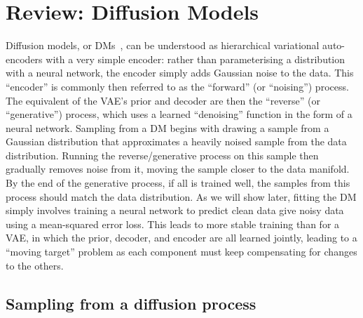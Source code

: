 \chapter{Review: Diffusion Models}
\label{sec:diffusion}

Diffusion models, or DMs~\citep{sohl2015deep,ho2020denoising,nichol2021improved,song2020score}, can be understood as hierarchical variational auto-encoders with a very simple encoder: rather than parameterising a distribution with a neural network, the encoder simply adds Gaussian noise to the data. This ``encoder'' is commonly then referred to as the ``forward'' (or ``noising'') process. The equivalent of the VAE's prior and decoder are then the ``reverse'' (or ``generative'') process, which uses a learned ``denoising'' function in the form of a neural network. Sampling from a DM begins with drawing a sample from a Gaussian distribution that approximates a heavily noised sample from the data distribution. Running the reverse/generative process on this sample then gradually removes noise from it, moving the sample closer to the data manifold. By the end of the generative process, if all is trained well, the samples from this process should match the data distribution. As we will show later, fitting the DM simply involves training a neural network to predict clean data give noisy data using a mean-squared error loss. This leads to more stable training than for a VAE, in which the prior, decoder, and encoder are all learned jointly, leading to a ``moving target'' problem as each component must keep compensating for changes to the others.


\section{Sampling from a diffusion process}

